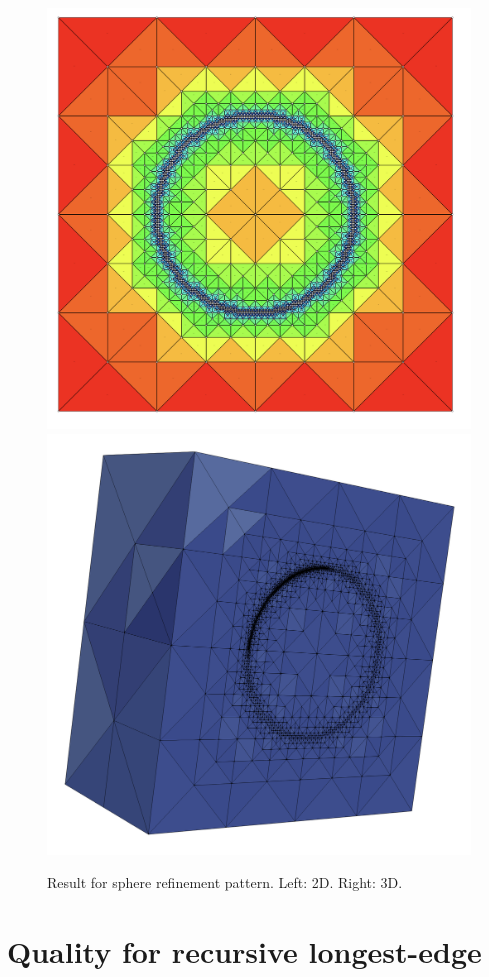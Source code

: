 \documentclass{article}
\begin{document}
\begin{figure}[htbp]
	\centering
	\includegraphics[width=0.40\linewidth]{figures/2d_sphere} \hfill
	\includegraphics[width=0.40\linewidth]{figures/3d_sphere} 
	\caption{Result for sphere refinement pattern. Left: 2D. Right: 3D.}
	\label{fig:sphere}
\end{figure}

\section{Quality for recursive longest-edge}
\end{document}
